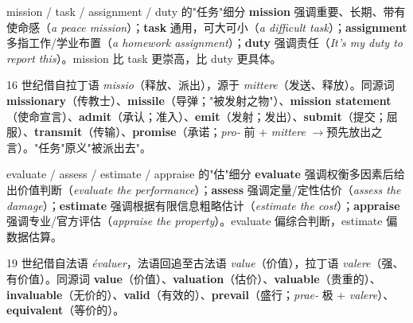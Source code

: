 \documentclass[../main.tex]{subfiles}
\begin{document}


\begin{lex}{mission / task / assignment / duty 的"任务"细分}
\textbf{mission} 强调重要、长期、带有使命感（\textit{a peace mission}）；\textbf{task} 通用，可大可小（\textit{a difficult task}）；\textbf{assignment} 多指工作/学业布置（\textit{a homework assignment}）；\textbf{duty} 强调责任（\textit{It's my duty to report this}）。mission 比 task 更崇高，比 duty 更具体。
\end{lex}

\begin{origin}
16 世纪借自拉丁语 \textit{missio}（释放、派出），源于 \textit{mittere}（发送、释放）。同源词 \textbf{missionary}（传教士）、\textbf{missile}（导弹；"被发射之物"）、\textbf{mission statement}（使命宣言）、\textbf{admit}（承认；准入）、\textbf{emit}（发射；发出）、\textbf{submit}（提交；屈服）、\textbf{transmit}（传输）、\textbf{promise}（承诺；\textit{pro-} 前 + \textit{mittere} $\to$预先放出之言）。"任务"原义"被派出去"。
\end{origin}



\begin{gram}{evaluate / assess / estimate / appraise 的"估"细分}
\textbf{evaluate} 强调权衡多因素后给出价值判断（\textit{evaluate the performance}）；\textbf{assess} 强调定量/定性估价（\textit{assess the damage}）；\textbf{estimate} 强调根据有限信息粗略估计（\textit{estimate the cost}）；\textbf{appraise} 强调专业/官方评估（\textit{appraise the property}）。evaluate 偏综合判断，estimate 偏数据估算。
\end{gram}

\begin{origin}
19 世纪借自法语 \textit{évaluer}，法语回追至古法语 \textit{value}（价值），拉丁语 \textit{valere}（强、有价值）。同源词 \textbf{value}（价值）、\textbf{valuation}（估价）、\textbf{valuable}（贵重的）、\textbf{invaluable}（无价的）、\textbf{valid}（有效的）、\textbf{prevail}（盛行；\textit{prae-} 极 + \textit{valere}）、\textbf{equivalent}（等价的）。
\end{origin}
\end{document}
